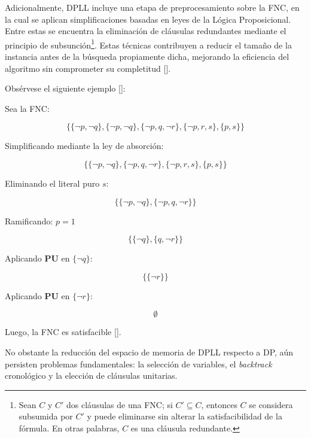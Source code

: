 Adicionalmente, DPLL incluye una etapa de preprocesamiento sobre la FNC, en la cual se aplican simplificaciones basadas en leyes de la L\'ogica Proposicional. Entre estas se encuentra la eliminaci\'on de cl\'ausulas redundantes mediante el principio de subsunci\'on\footnote{Sean $C$ y $C'$ dos cl\'ausulas de una FNC; si $C' \subseteq C$, entonces $C$ se considera subsumida por $C'$ y puede eliminarse sin alterar la satisfacibilidad de la f\'ormula. En otras palabras, $C$ es una cl\'ausula redundante.}. Estas t\'ecnicas contribuyen a reducir el tama\~no de la instancia antes de la b\'usqueda propiamente dicha, mejorando la eficiencia del algoritmo sin comprometer su completitud [\cite{garcia-satcap}].

Obsérvese el siguiente ejemplo [\cite{garcia-satcap}]:

Sea la FNC:

\begin{equation*}
\{\{\neg p,\neg q\},\{\neg p, \neg q\},\{\neg p,q,\neg r\},\{\neg p,r,s\},\{p,s\}\}
\end{equation*}

Simplificando mediante la ley de absorción:

\begin{equation*}
\{\{\neg p,\neg q\},\{\neg p,q,\neg r\},\{\neg p,r,s\},\{p,s\}\}
\end{equation*}

Eliminando el literal puro $s$:

\begin{equation*}
\{\{\neg p,\neg q\},\{\neg p,q,\neg r\}\}
\end{equation*}

Ramificando: $p = 1$

\begin{equation*}
\{\{\neg q\},\{q,\neg r\}\}
\end{equation*}

Aplicando \textbf{PU} en $\{\neg q\}$:

\begin{equation*}
\{\{\neg r\}\}
\end{equation*}

Aplicando \textbf{PU} en $\{\neg r\}$:

\begin{equation*}
\emptyset
\end{equation*}

Luego, la FNC es satisfacible [\cite{garcia-satcap}].

No obstante la reducción del espacio de memoria de DPLL respecto a DP, a\'un persisten problemas fundamentales: la selección de variables, el \textit{backtrack} cronológico y la elección de cláusulas unitarias.

